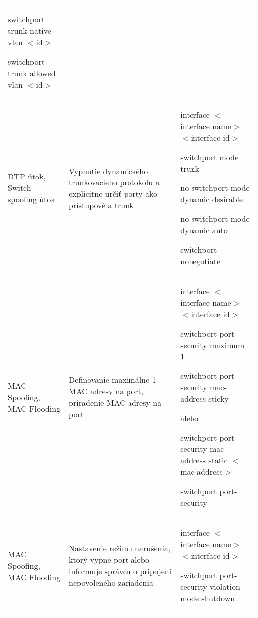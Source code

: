 \begin{longtable}[!htbp]{|L{10em}L{10em}>{\selectfont}L{34em}|}
	\hspace{0.5em}switchport trunk native vlan $<$id$>$
	
	\hspace{0.5em}switchport trunk allowed vlan $<$id$>$\\
	
	
	
	
	 DTP útok, Switch spoofing útok	&Vypnutie dynamického trunkovacieho protokolu a explicitne určiť porty ako prístupové a trunk	&
	interface $<$interface name$>$ $<$interface id$>$
	
	\hspace{0.5em}switchport mode trunk
	
	\hspace{0.5em}no switchport mode dynamic desirable
	
	\hspace{0.5em}no switchport mode dynamic auto
	
	\hspace{0.5em}switchport nonegotiate\\
	
	
	
	MAC Spoofing, MAC Flooding 	&Definovanie maximálne 1 MAC adresy na port, priradenie MAC adresy na port	&
	interface $<$interface name$>$ $<$interface id$>$
	
	\hspace{0.5em}switchport port-security maximum 1
	
	\hspace{0.5em}switchport port-security mac-address sticky
	
	\vspace{0.5em}
	{\selectfont alebo}
	\vspace{0.5em}
	
	\hspace{0.5em}switchport port-security mac-address static $<$mac address$>$
	
	\hspace{0.5em}switchport port-security\\
	
	
	
	 MAC Spoofing, MAC Flooding 	&Nastavenie režimu narušenia, ktorý vypne port alebo informuje správcu o pripojení nepovoleného zariadenia	&interface $<$interface name$>$ $<$interface id$>$
	
	\hspace{0.5em}switchport port-security violation mode shutdown
	

\end{longtable}

